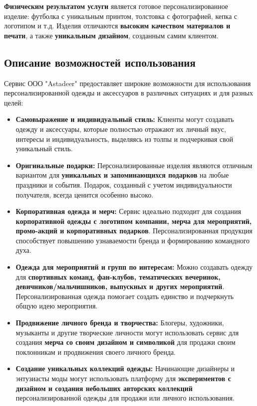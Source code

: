 \vspace{0.3cm}

\textbf{Физическим результатом услуги} является готовое персонализированное изделие: футболка с уникальным принтом, толстовка с фотографией, кепка с логотипом и т.д.  Изделия отличаются \textbf{высоким качеством материалов и печати}, а также \textbf{уникальным дизайном}, созданным самим клиентом.

\subsection{Описание возможностей использования}

Сервис ООО "Astadeer" предоставляет широкие возможности для использования персонализированной одежды и аксессуаров в различных ситуациях и для разных целей:

\begin{itemize}
    \item \textbf{Самовыражение и индивидуальный стиль:}  Клиенты могут создавать одежду и аксессуары, которые полностью отражают их личный вкус, интересы и индивидуальность, выделяясь из толпы и подчеркивая свой уникальный стиль.
    \item \textbf{Оригинальные подарки:}  Персонализированные изделия являются отличным вариантом для \textbf{уникальных и запоминающихся подарков} на любые праздники и события.  Подарок, созданный с учетом индивидуальности получателя, всегда ценится особенно высоко.
    \item \textbf{Корпоративная одежда и мерч:}  Сервис идеально подходит для создания \textbf{корпоративной одежды с логотипом компании, мерча для мероприятий, промо-акций и корпоративных подарков}.  Персонализированная продукция способствует повышению узнаваемости бренда и формированию командного духа.
    \item \textbf{Одежда для мероприятий и групп по интересам:}  Можно создавать одежду для \textbf{спортивных команд, фан-клубов, тематических вечеринок, девичников/мальчишников, выпускных и других мероприятий}.  Персонализированная одежда помогает создать единство и подчеркнуть общую идею мероприятия.
    \item \textbf{Продвижение личного бренда и творчества:}  Блогеры, художники, музыканты и другие творческие личности могут использовать сервис для создания \textbf{мерча со своим дизайном и символикой} для продажи своим поклонникам и продвижения своего личного бренда.
    \item \textbf{Создание уникальных коллекций одежды:}  Начинающие дизайнеры и энтузиасты моды могут использовать платформу для \textbf{экспериментов с дизайном и создания небольших авторских коллекций} персонализированной одежды для продажи или личного использования.
\end{itemize}

